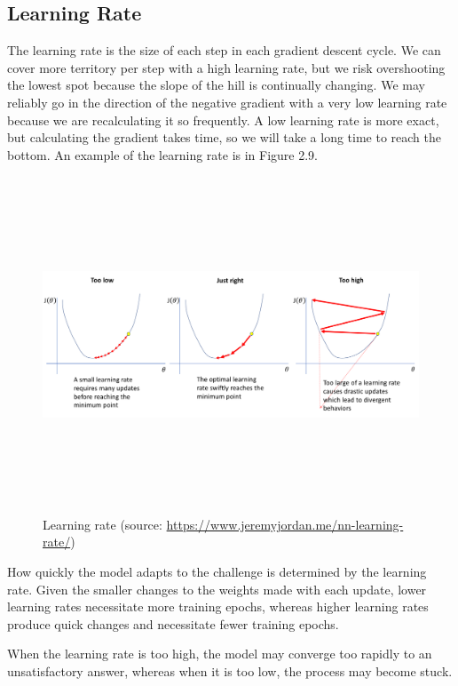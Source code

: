 \subsection{Learning Rate}
\label{subsec:learning_rate}
\hspace{0.5cm}The learning rate is the size of each step in each gradient descent cycle. We can cover more territory per step with a high learning rate, but we risk overshooting the lowest spot because the slope of the hill is continually changing. We may reliably go in the direction of the negative gradient with a very low learning rate because we are recalculating it so frequently. A low learning rate is more exact, but calculating the gradient takes time, so we will take a long time to reach the bottom. An example of the learning rate is in Figure 2.9.
\begin{figure}[!h]
	\centering
	\includegraphics[width=\linewidth, height=10cm,keepaspectratio]{figures/learning rate.png}
   \caption{Learning rate (source: \url{https://www.jeremyjordan.me/nn-learning-rate/})}
\end{figure}

How quickly the model adapts to the challenge is determined by the learning rate. Given the smaller changes to the weights made with each update, lower learning rates necessitate more training epochs, whereas higher learning rates produce quick changes and necessitate fewer training epochs.

When the learning rate is too high, the model may converge too rapidly to an unsatisfactory answer, whereas when it is too low, the process may become stuck.

